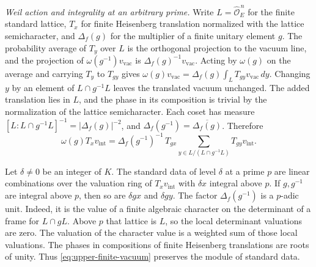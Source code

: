 \emph{Weil action and integrality at an arbitrary prime.}
Write \(L=\widehat{\mathcal O}_E^{\,n}\) for the finite standard lattice,
\(T_x\) for finite Heisenberg translation normalized with the lattice
semicharacter, and \(\Delta_f(g)\) for the multiplier of a finite
unitary element \(g\). The probability average of \(T_y\) over \(L\)
is the orthogonal projection to the vacuum line, and the projection of
\(\omega(g^{-1})v_\mathrm{vac}\) is \(\Delta_f(g)^{-1}v_\mathrm{vac}\).
Acting by \(\omega(g)\) on the average and carrying \(T_y\) to \(T_{gy}\)
gives \(\omega(g)v_\mathrm{vac}=\Delta_f(g)\int_L T_{gy}v_\mathrm{vac}\,dy\).
Changing \(y\) by an element of \(L\cap g^{-1}L\) leaves the translated
vacuum unchanged. The added translation lies in \(L\), and the phase
in its composition is trivial by the normalization of the lattice
semicharacter. Each coset has measure
\([L:L\cap g^{-1}L]^{-1}=|\Delta_f(g)|^{-2}\), and
\(\Delta_f(g^{-1})=\overline{\Delta_f(g)}\). Therefore
\begin{equation}\label{eq:upper-finite-vacuum}
 \omega(g)T_xv_\mathrm{int}=
 \Delta_f(g^{-1})^{-1}\,T_{gx}
       \sum_{y\in L/(L\cap g^{-1}L)}T_{gy}v_\mathrm{int}.
\end{equation}

Let \(\delta\ne0\) be an integer of \(K\). The standard data of level
\(\delta\) at a prime \(p\) are linear combinations over the valuation
ring of \(T_xv_\mathrm{int}\) with \(\delta x\) integral above \(p\).
If \(g,g^{-1}\) are integral above \(p\), then so are \(\delta gx\) and
\(\delta gy\). The factor \(\Delta_f(g^{-1})\) is a \(p\)-adic unit.
Indeed, it is the value of a finite algebraic character on the
determinant of a frame for \(L\cap gL\). Above \(p\) that lattice is
\(L\), so the local determinant valuations are zero. The valuation of
the character value is a weighted sum of those local valuations.
The phases in compositions of finite Heisenberg translations are
roots of unity. Thus \eqref{eq:upper-finite-vacuum} preserves the module
of standard data.

